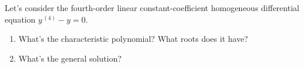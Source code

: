 \documentclass{ximera}
\begin{document}
\newpage

Let's consider the fourth-order linear constant-coefficient homogeneous differential equation $y^{\,(4)}-y=0$.

\begin{enumerate}
\item What's the characteristic polynomial?  What roots does it have?


\vspace{2cm}

\item What's the general solution?


\vfill


\end{enumerate}
\end{document}
